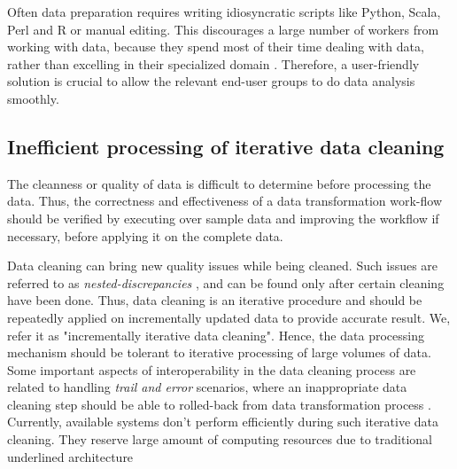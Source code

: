 Often data preparation requires writing idiosyncratic scripts like Python, Scala, Perl and R or manual editing. This discourages a large number of workers from working with data, because they spend most of their time dealing with data, rather than excelling in their specialized domain \cite{visualizationsandtransformationsinwrangling}. Therefore, a user-friendly solution is crucial to allow the relevant end-user groups to do data analysis smoothly.

\subsection{Inefficient processing of iterative data cleaning}
\noindent The cleanness or quality of data is difficult to determine before processing the data. Thus, the correctness and effectiveness of a data transformation work-flow should be verified by executing over sample data and improving the workflow if necessary, before applying it on the complete data. 

Data cleaning can bring new quality issues  while being cleaned. Such issues are referred to as \textit{nested-discrepancies },\cite{journals/corr/KrishnanW0FG16} and can be found only after certain cleaning have been done. Thus, data cleaning is an iterative procedure \cite{Wisteria} and should be repeatedly applied on incrementally updated data to provide accurate result. We, refer it as "incrementally iterative data cleaning". Hence, the data processing mechanism should be tolerant to iterative processing of large volumes of data. Some important aspects of interoperability in the data cleaning process are related to handling \textit{trail and error} scenarios, where an inappropriate data cleaning step should be able to rolled-back from data transformation process \cite{visualizationsandtransformationsinwrangling}. Currently, available systems don't perform efficiently during such iterative data cleaning. They reserve large amount of computing resources due to traditional underlined architecture

